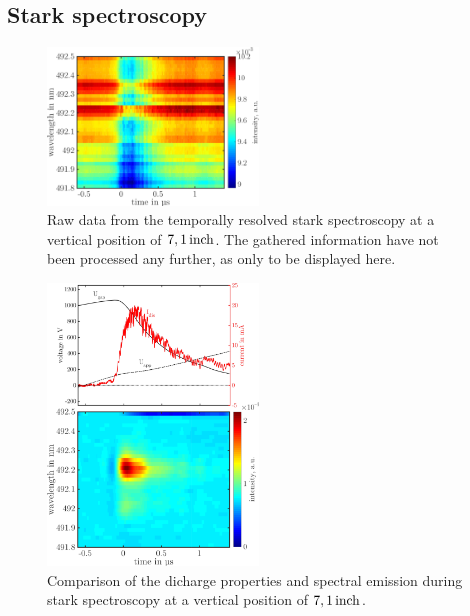 \documentclass[a4paper,10pt,twoside]{article}
\begin{document}
			\begin{multicols}{2}
				
			\end{multicols}
			
			\twocolumn
		
		\subsection{Stark spectroscopy}
		
				\begin{figure}[h]
					\centering
					\includegraphics[width=0.5\textwidth]{figures/stark/stark_71inraw.pdf}
					\caption{Raw data from the temporally resolved stark spectroscopy at a vertical position of $\unit[7,1]{inch}$. The gathered information have not been processed any further, as only to be displayed here.}
				\end{figure}

				\begin{figure}
					\centering
						\includegraphics[width=0.5\textwidth]{figures/stark/stark71combination.pdf}
					\caption{Comparison of the dicharge properties and spectral emission during stark spectroscopy at a vertical position of $\unit[7,1]{inch}$. }
					\label{img:stark71comparison}
				\end{figure}
\end{document}
